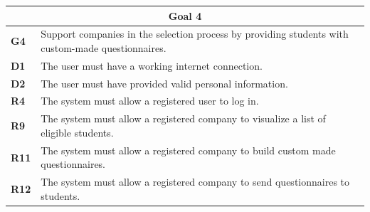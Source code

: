 \begin{table}[H]
    \centering
    \begin{tabular}{|l|m{10cm}|}
        \hline \multicolumn{2}{|c|}{\textbf{Goal 4}} \\
        \hline \textbf{G4} & Support companies in the selection process by providing students with custom-made questionnaires. \\
        \hline \textbf{D1} & The user must have a working internet connection. \\
        \hline \textbf{D2} & The user must have provided valid personal information. \\
        \hline \textbf{R4} & The system must allow a registered user to log in. \\
        \hline \textbf{R9} & The system must allow a registered company to visualize a list of eligible students. \\
        \hline \textbf{R11} & The system must allow a registered company to build custom made questionnaires. \\
        \hline \textbf{R12} & The system must allow a registered company to send questionnaires to students. \\

\end{tabular}
\end{table}
